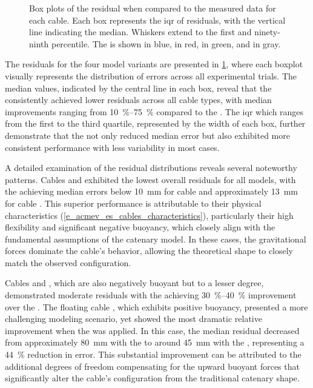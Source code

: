 \begin{figure}
	\centering
	\caption{
		Box plots of the residual when compared to the measured data for each cable. Each box represents
		the \acl{iqr} of residuals, with the vertical line indicating the median. Whiskers extend to the first
		and ninety-ninth percentile. The \verticalmodel{} is shown in blue, \gammamodel{} in red,
		\thetamodel{} in green, and \thetagammamodel{} in gray.
	}
	\label{cm_acm_ev_sr_cables_boxplot}
\end{figure}

The residuals for the four model variants are presented in \cref{cm_acm_ev_sr_cables_boxplot},
where each boxplot visually represents the distribution of errors across all experimental trials.
The median values, indicated by the central line in each box, reveal that the \thetagammamodel{}
consistently achieved lower residuals across all cable types, with median improvements ranging from
\qtyrange{10}{75}{\percent} compared to the \verticalmodel{}. The \ac{iqr} which ranges from the
first to the third quartile, represented by the width of each box, further demonstrate that the
\thetagammamodel{} not only reduced median error but also exhibited more consistent performance
with less variability in most cases.

A detailed examination of the residual distributions reveals several noteworthy patterns. Cables
 and  exhibited the lowest overall residuals
for all models, with the \thetagammamodel{} achieving median errors below \qty{10}{\milli\meter}
for cable  and approximately \qty{13}{\milli\meter} for cable
. This superior performance is attributable to their physical
characteristics (\cref{e_acmev_es_cables_characteristics}), particularly their high flexibility and
significant negative buoyancy, which closely align with the fundamental assumptions of the catenary
model. In these cases, the gravitational forces dominate the cable's behavior, allowing the
theoretical shape to closely match the observed configuration.

Cables  and , which are also negatively buoyant
but to a lesser degree, demonstrated moderate residuals with the \thetagammamodel{} achieving
\qtyrange{30}{40}{\percent} improvement over the \verticalmodel{}. The floating cable
, which exhibits positive buoyancy, presented a more challenging
modeling scenario, yet showed the most dramatic relative improvement when the \thetagammamodel{}
was applied. In this case, the median residual decreased from approximately \qty{80}{\milli\meter}
with the \verticalmodel{} to around \qty{45}{\milli\meter} with the \thetagammamodel{},
representing a \qty{44}{\percent} reduction in error. This substantial improvement can be
attributed to the additional degrees of freedom compensating for the upward buoyant forces that
significantly alter the cable's configuration from the traditional catenary shape.

